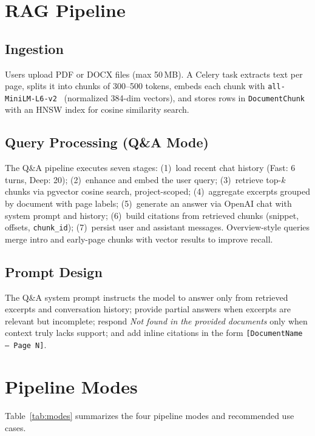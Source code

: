\documentclass[sigplan,review,anonymous]{acmart}
\begin{document}
\section{RAG Pipeline}
\label{sec:rag}

\subsection{Ingestion}
Users upload PDF or DOCX files (max 50\,MB).
A Celery task extracts text per page, splits it into chunks of 300--500 tokens, embeds each
chunk with \texttt{all-MiniLM-L6-v2}~\cite{reimers2019sbert} (normalized 384-dim vectors),
and stores rows in \texttt{DocumentChunk} with an HNSW index for cosine similarity search.

\subsection{Query Processing (Q\&A Mode)}
The Q\&A pipeline executes seven stages:
(1)~load recent chat history (Fast: 6 turns, Deep: 20);
(2)~enhance and embed the user query;
(3)~retrieve top-$k$ chunks via pgvector cosine search, project-scoped;
(4)~aggregate excerpts grouped by document with page labels;
(5)~generate an answer via OpenAI chat with system prompt and history;
(6)~build citations from retrieved chunks (snippet, offsets, \texttt{chunk\_id});
(7)~persist user and assistant messages.
Overview-style queries merge intro and early-page chunks with vector results to improve recall.

\subsection{Prompt Design}
The Q\&A system prompt instructs the model to answer only from retrieved excerpts and
conversation history; provide partial answers when excerpts are relevant but incomplete;
respond \emph{Not found in the provided documents} only when context truly lacks support;
and add inline citations in the form \texttt{[DocumentName -- Page N]}.

\section{Pipeline Modes}
\label{sec:modes}

Table~\ref{tab:modes} summarizes the four pipeline modes and recommended use cases.
\end{document}
